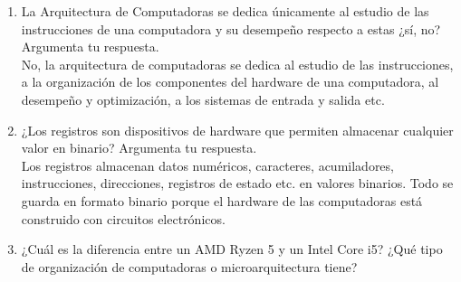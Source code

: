 \documentclass[a4paper,12pt]{article}
\begin{document}
\begin{enumerate}[label=\textcolor{teal}{\textbf{\arabic*.}}]
        \item La Arquitectura de Computadoras se dedica  únicamente al estudio de las instrucciones de una computadora y su desempeño respecto a estas ¿sí, no? Argumenta tu respuesta.\\

            No, la arquitectura de computadoras se dedica al estudio de las instrucciones, a la organización de los componentes del hardware de una computadora, al desempeño y optimización, a los sistemas de entrada y salida etc.\\
      
        \item ¿Los registros son dispositivos de hardware que permiten almacenar cualquier valor en binario? Argumenta tu respuesta.\\
        
            Los registros almacenan datos numéricos, caracteres, acumiladores, instrucciones, direcciones, registros de estado etc. en valores binarios. Todo se guarda en formato binario porque el hardware de las computadoras está construido con circuitos electrónicos. \\


        \item ¿Cuál es la diferencia entre un AMD Ryzen 5 y un Intel Core i5? ¿Qué tipo de organización de computadoras o microarquitectura tiene?
        

\end{enumerate}
\end{document}
